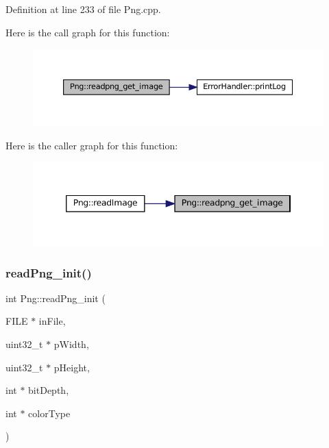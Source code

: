 Definition at line 233 of file Png.\+cpp.

Here is the call graph for this function\+:\nopagebreak
\begin{figure}[H]
\begin{center}
\leavevmode
\includegraphics[width=350pt]{classPng_a2a1a70412369c257a8d56c54753d7d43_cgraph}
\end{center}
\end{figure}
Here is the caller graph for this function\+:\nopagebreak
\begin{figure}[H]
\begin{center}
\leavevmode
\includegraphics[width=346pt]{classPng_a2a1a70412369c257a8d56c54753d7d43_icgraph}
\end{center}
\end{figure}
\mbox{\label{classPng_a54cee101f15423f12d822cb369bcda42}} 
\subsubsection{\texorpdfstring{readPng\_init()}{readPng\_init()}}
{\footnotesize\ttfamily int Png\+::read\+Png\+\_\+init (\begin{DoxyParamCaption}\item[{F\+I\+LE $\ast$}]{in\+File,  }\item[{uint32\+\_\+t $\ast$}]{p\+Width,  }\item[{uint32\+\_\+t $\ast$}]{p\+Height,  }\item[{int $\ast$}]{bit\+Depth,  }\item[{int $\ast$}]{color\+Type }\end{DoxyParamCaption})\hspace{0.3cm}{\ttfamily [private]}}



